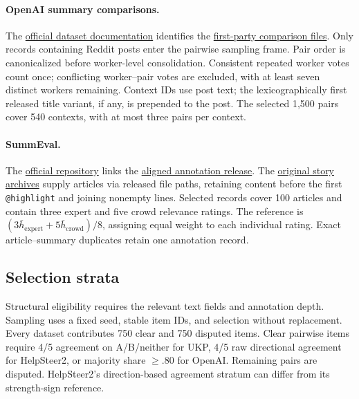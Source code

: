 \paragraph{OpenAI summary comparisons.}
The \href{https://github.com/openai/summarize-from-feedback#human-feedback-data}{official dataset documentation} identifies the \href{https://openaipublic.blob.core.windows.net/summarize-from-feedback/dataset/comparisons/}{first-party comparison files}.
Only records containing Reddit posts enter the pairwise sampling frame. Pair order is canonicalized before worker-level consolidation. Consistent repeated worker votes count once; conflicting worker--pair votes are excluded, with at least seven distinct workers remaining. Context IDs use post text; the lexicographically first released title variant, if any, is prepended to the post. The selected 1,500 pairs cover 540 contexts, with at most three pairs per context.

\paragraph{SummEval.}
The \href{https://github.com/Yale-LILY/SummEval}{official repository} links the \href{https://storage.googleapis.com/sfr-summarization-repo-research/model_annotations.aligned.jsonl}{aligned annotation release}.
The \href{https://cs.nyu.edu/~kcho/DMQA/}{original story archives} supply articles via released file paths, retaining content before the first \texttt{@highlight} and joining nonempty lines. Selected records cover 100 articles and contain three expert and five crowd relevance ratings. The reference is $(3\bar h_{\mathrm{expert}}+5\bar h_{\mathrm{crowd}})/8$, assigning equal weight to each individual rating. Exact article--summary duplicates retain one annotation record.

\subsection{Selection strata}
\label{app:selection}
Structural eligibility requires the relevant text fields and annotation depth. Sampling uses a fixed seed, stable item IDs, and selection without replacement. Every dataset contributes 750 clear and 750 disputed items. Clear pairwise items require 4/5 agreement on A/B/neither for UKP, 4/5 raw directional agreement for HelpSteer2, or majority share $\geq .80$ for OpenAI. Remaining pairs are disputed. HelpSteer2's direction-based agreement stratum can differ from its strength-sign reference.

